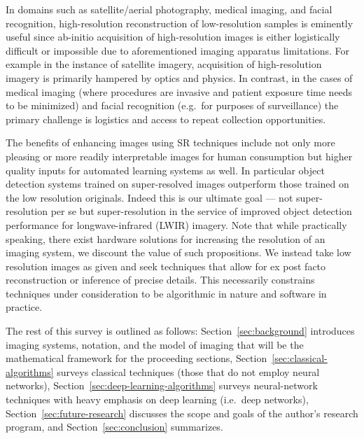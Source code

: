 In domains such as satellite/aerial photography, medical imaging, and facial recognition,
high-resolution reconstruction of low-resolution samples is eminently useful since ab-initio acquisition of high-resolution images is either logistically difficult or impossible due to aforementioned imaging apparatus limitations.
%
For example in the instance of satellite imagery, acquisition of high-resolution imagery is primarily hampered by optics and physics.
%
In contrast, in the cases of medical imaging (where procedures are invasive and patient exposure time needs to be minimized\cite{doi:10.1002.cmr.a.21249}) and facial recognition (e.g.\ for purposes of surveillance) the primary challenge is logistics and access to repeat collection opportunities.

The benefits of enhancing images using SR techniques include not only more pleasing or more readily interpretable images for human consumption but higher quality inputs for automated learning systems as well.
%
In particular object detection systems trained on super-resolved images outperform those trained on the low
resolution originals\cite{effectssuperres}.
%
Indeed this is our ultimate goal --- not super-resolution per se but super-resolution in the service of improved object detection performance for longwave-infrared (LWIR) imagery.
%
Note that while practically speaking, there exist hardware solutions for increasing the resolution of an imaging
system, we discount the value of such propositions.
%
We instead take low resolution images as given and seek techniques that allow for ex post facto reconstruction or inference of precise details.
%
This necessarily constrains techniques under consideration to be algorithmic in nature and software in practice.

The rest of this survey is outlined as follows: Section~\ref{sec:background} introduces imaging systems, notation, and the model of imaging that will be the mathematical framework for the proceeding sections, Section~\ref{sec:classical-algorithms} surveys classical techniques (those that do not employ neural networks), Section~\ref{sec:deep-learning-algorithms} surveys neural-network techniques with heavy emphasis on deep learning (i.e.\ deep networks), Section~\ref{sec:future-research} discusses the scope and goals of the author's research program, and Section~\ref{sec:conclusion} summarizes.
